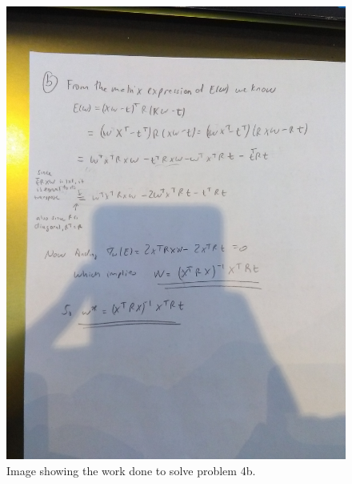 \documentclass[12pt]{article}
\begin{document}
\begin{figure}[!htbp]
\centering
\includegraphics[width=15cm]{problem4b.jpg}
\caption{Image showing the work done to solve problem 4b.}
\end{figure}
\end{document}
